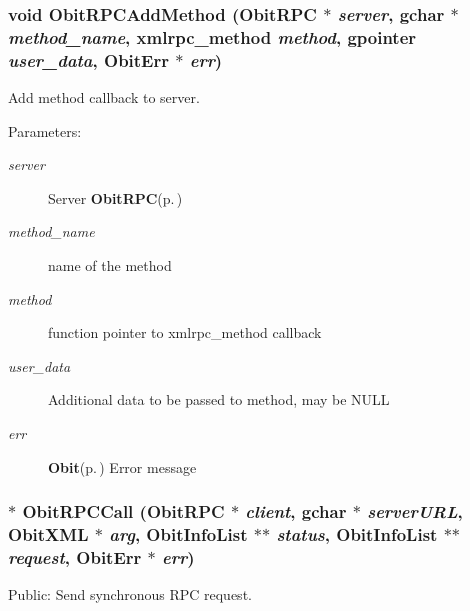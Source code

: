 \subsubsection{\setlength{\rightskip}{0pt plus 5cm}void Obit\-RPCAdd\-Method ({\bf Obit\-RPC} $\ast$ {\em server}, gchar $\ast$ {\em method\_\-name}, xmlrpc\_\-method {\em method}, gpointer {\em user\_\-data}, {\bf Obit\-Err} $\ast$ {\em err})}\label{ObitRPC_8c_a14}


Add method callback to server. 

\begin{Desc}
\item[Parameters:]
\begin{description}
\item[{\em server}]Server {\bf Obit\-RPC}{\rm (p.\,\pageref{structObitRPC})} \item[{\em method\_\-name}]name of the method \item[{\em method}]function pointer to xmlrpc\_\-method callback \item[{\em user\_\-data}]Additional data to be passed to method, may be NULL \item[{\em err}]{\bf Obit}{\rm (p.\,\pageref{structObit})} Error message \end{description}
\end{Desc}
\subsubsection{$\ast$ Obit\-RPCCall ({\bf Obit\-RPC} $\ast$ {\em client}, gchar $\ast$ {\em server\-URL}, {\bf Obit\-XML} $\ast$ {\em arg}, {\bf Obit\-Info\-List} $\ast$$\ast$ {\em status}, {\bf Obit\-Info\-List} $\ast$$\ast$ {\em request}, {\bf Obit\-Err} $\ast$ {\em err})}\label{ObitRPC_8c_a11}


Public: Send synchronous RPC request. 

